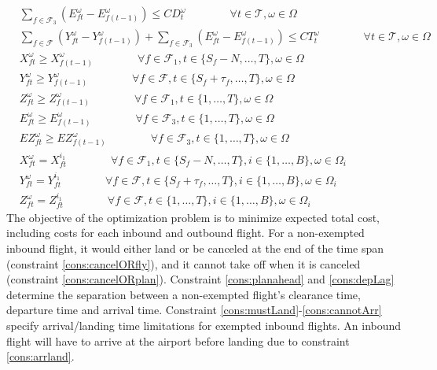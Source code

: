 \documentclass[12pt]{article}
\begin{document}
\begin{subequations}
\begin{align}
			& \sum_{f \in \mathcal{F}_3}\left(E_{ft}^\omega - E_{f(t-1)}^\omega\right) \leq CD_{t}^\omega \qquad \qquad \forall t \in \mathcal{T}, \omega \in \Omega \label{cons:deptCap}\\
			& \sum_{f \in \mathcal{F}}\left(Y_{ft}^\omega - Y_{f(t-1)}^\omega\right) + \sum_{f \in \mathcal{F}_3}\left(E_{ft}^\omega - E_{f(t-1)}^\omega\right) \leq CT_t^\omega \qquad \qquad \forall t \in \mathcal{T}, \omega \in \Omega \label{cons:totalCap}\\
			& X_{ft}^\omega \geq X_{f(t-1)}^\omega \qquad \qquad \forall f \in \mathcal{F}_1, t \in \{S_f - N, \dots, T\}, \omega \in \Omega \label{cons:xupdate}\\
			& Y_{ft}^\omega \geq Y_{f(t-1)}^\omega \qquad \qquad \forall f \in \mathcal{F}, t \in \{S_f + \tau_f, \dots, T\}, \omega \in \Omega \label{cons:yupdate}\\
			& Z_{ft}^\omega \geq Z_{f(t-1)}^\omega \qquad \qquad \forall f \in \mathcal{F}_1, t \in \{1, \dots, T\}, \omega \in \Omega \label{cons:zupdate}\\
			& E_{ft}^\omega \geq E_{f(t-1)}^\omega \qquad \qquad \forall f \in \mathcal{F}_3, t \in \{1, \dots, T\}, \omega \in \Omega \label{cons:eupdate}\\
			& EZ_{ft}^\omega \geq EZ_{f(t-1)}^\omega \qquad \qquad \forall f \in \mathcal{F}_3, t \in \{1, \dots, T\}, \omega \in \Omega \label{cons:ezupdate}\\
			& X_{ft}^\omega = X_{ft}^{i_1} \qquad \qquad \forall f \in \mathcal{F}_1, t \in \{S_f - N, \dots, T\}, i \in \{1, \dots, B\}, \omega \in \Omega_i \label{cons:nonAntX}\\
			& Y_{ft}^\omega = Y_{ft}^{i_1} \qquad \qquad \forall f \in \mathcal{F}, t \in \{S_f + \tau_f, \dots, T\}, i \in \{1, \dots, B\}, \omega \in \Omega_i \label{cons:nonAntY}\\
			& Z_{ft}^\omega = Z_{ft}^{i_1} \qquad \qquad \forall f \in \mathcal{F}, t \in \{1, \dots, T\}, i \in \{1, \dots, B\}, \omega \in \Omega_i \label{cons:nonAntZ}
		\end{align}
	\end{subequations}
	The objective of the optimization problem is to minimize expected total cost, including costs for each inbound and outbound flight. For a non-exempted inbound flight, it would either land or be canceled at the end of the time span (constraint \eqref{cons:cancelORfly}), and it cannot take off when it is canceled (constraint \eqref{cons:cancelORplan}). Constraint \eqref{cons:planahead} and \eqref{cons:depLag} determine the separation between a non-exempted flight's clearance time, departure time and arrival time. Constraint \eqref{cons:mustLand}-\eqref{cons:cannotArr} specify arrival/landing time limitations for exempted inbound flights. An inbound flight will have to arrive at the airport before landing due to constraint \eqref{cons:arrland}.\\
\end{document}
